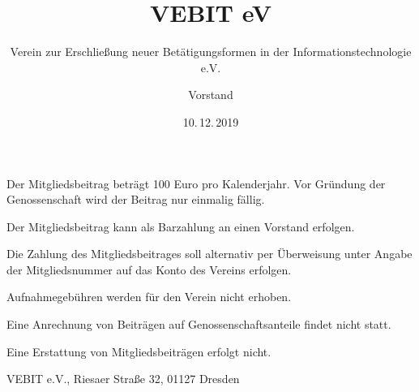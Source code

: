 \documentclass[fontsize=11pt,pagesize,parskip=half]{scrartcl}
\begin{document}
\author{Vorstand}
\subject{Beitragsordnung}
\title{VEBIT eV}
\subtitle{Verein zur Erschließung neuer Betätigungsformen in der Informationstechnologie e.V.}
\date{10.\,12.\,2019}
\maketitle



\appendix

\begin{contract}



Der Mitgliedsbeitrag beträgt 100 Euro pro Kalenderjahr.
Vor Gründung der Genossenschaft wird der Beitrag nur einmalig fällig.



Der Mitgliedsbeitrag kann als Barzahlung an einen Vorstand erfolgen.

Die Zahlung des Mitgliedsbeitrages soll alternativ per Überweisung unter Angabe der Mitgliedsnummer auf das Konto des Vereins erfolgen.



Aufnahmegebühren werden für den Verein nicht erhoben.

Eine Anrechnung von Beiträgen auf Genossenschaftsanteile findet nicht statt.

Eine Erstattung von Mitgliedsbeiträgen erfolgt nicht.

\end{contract}

\vfill

VEBIT e.V., Riesaer Straße 32, 01127 Dresden
\end{document}

